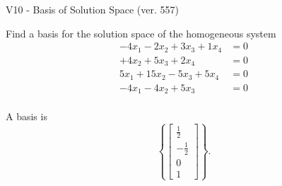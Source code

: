 \begin{exercise}
  \begin{exerciseTitle}V10 - Basis of Solution Space (ver. 557)\end{exerciseTitle}
  \begin{exerciseStatement}
    Find a basis for the solution space of the homogeneous system 
\begin{align*}
 -4 x_ 1 -2 x_ 2 + 3 x_ 3 + 1 x_ 4 &= 0  \\ 
  + 4 x_ 2 + 5 x_ 3 + 2 x_ 4 &= 0  \\ 
  5 x_ 1 + 15 x_ 2 -5 x_ 3 + 5 x_ 4 &= 0  \\ 
  -4 x_ 1 -4 x_ 2 + 5 x_ 3 &= 0  \\ 
 \end{align*}


 
  \end{exerciseStatement}

  \begin{exerciseAnswer}
   A basis is   
\[\left\{\left[\begin{array}{c}
\frac{1}{2} \\
-\frac{1}{2} \\
0 \\
1
\end{array}\right]\right\}.\]

  


  \end{exerciseAnswer}
\end{exercise}